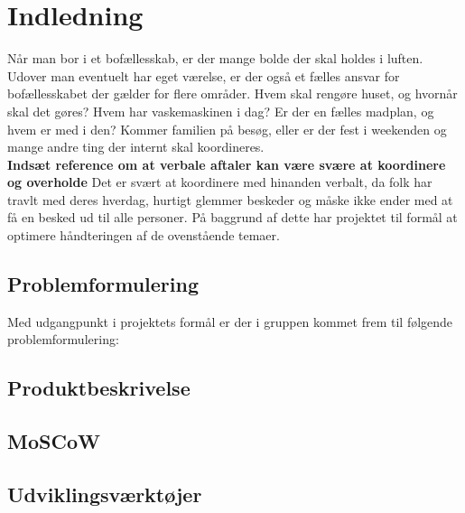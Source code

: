 \chapter{Indledning}

\noindent Når man bor i et bofællesskab, er der mange bolde der skal holdes i luften. Udover man eventuelt har eget værelse, er der også et fælles ansvar for bofællesskabet der gælder for flere områder. Hvem skal rengøre huset, og hvornår skal det gøres? Hvem har vaskemaskinen i dag? Er der en fælles madplan, og hvem er med i den? Kommer familien på besøg, eller er der fest i weekenden og mange andre ting der internt skal koordineres. \\ \textbf{Indsæt reference om at verbale aftaler kan være svære at koordinere og overholde} Det er svært at koordinere med hinanden verbalt, da folk har travlt med deres hverdag, hurtigt glemmer beskeder og måske ikke ender med at få en besked ud til alle personer. På baggrund af dette har projektet til formål at optimere håndteringen af de ovenstående temaer.


\section{Problemformulering}
Med udgangpunkt i projektets formål er der i gruppen kommet frem til følgende problemformulering:


\section{Produktbeskrivelse}


\section{MoSCoW}


\section{Udviklingsværktøjer}
